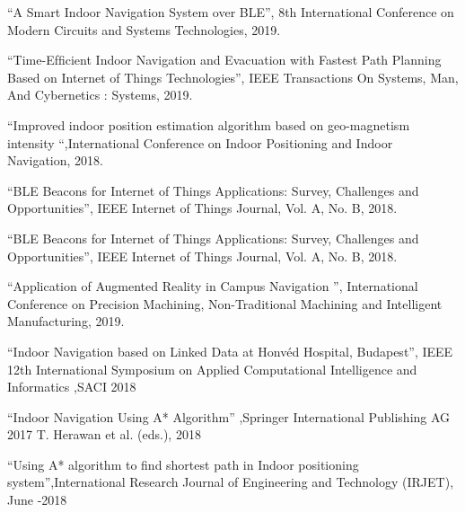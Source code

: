 \documentclass[a4paper, 12pt]{article}
\begin{document}
\begin{thebibliography}{21}
	“A Smart Indoor Navigation System over BLE”, 8th International Conference on Modern Circuits and Systems Technologies, 2019.
	
	“Time-Efﬁcient Indoor Navigation and Evacuation with Fastest Path Planning Based on Internet of Things Technologies”, IEEE Transactions On Systems, Man, And Cybernetics : Systems, 2019.
	
	“Improved indoor position estimation algorithm based on geo-magnetism intensity “,International Conference on Indoor Positioning and Indoor Navigation, 2018.
	
	“BLE Beacons for Internet of Things Applications: Survey, Challenges and Opportunities”, IEEE Internet of Things Journal, Vol. A, No. B, 2018.
	
	“BLE Beacons for Internet of Things Applications: Survey, Challenges and Opportunities”, IEEE Internet of Things Journal, Vol. A, No. B, 2018.
	
	
	“Application of Augmented Reality in Campus Navigation ”, International Conference on Precision Machining, Non-Traditional Machining and Intelligent Manufacturing, 2019.
	
	
	“Indoor Navigation based on Linked Data at Honvéd Hospital, Budapest”, IEEE 12th International Symposium on Applied Computational Intelligence and Informatics ,SACI 2018
	
	“Indoor Navigation Using A* Algorithm” ,Springer International Publishing AG 2017 T. Herawan et al. (eds.), 2018
	
	
	“Using A* algorithm to find shortest path in Indoor positioning system”,International Research Journal of Engineering and Technology (IRJET), June -2018
	
\end{thebibliography}
\end{document}
